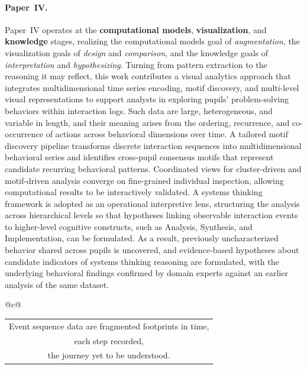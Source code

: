\paragraph{Paper~IV.}
Paper~IV operates at the \textbf{computational models}, \textbf{visualization}, and \textbf{knowledge} stages, realizing the computational models goal of \textit{augmentation}, the visualization goals of \textit{design} and \textit{comparison}, and the knowledge goals of \textit{interpretation} and \textit{hypothesizing}.
Turning from pattern extraction to the reasoning it may reflect, this work contributes a visual analytics approach that integrates multidimensional time series encoding, motif discovery, and multi-level visual representations to support analysts in exploring pupils' problem-solving behaviors within interaction logs.
Such data are large, heterogeneous, and variable in length, and their meaning arises from the ordering, recurrence, and co-occurrence of actions across behavioral dimensions over time.
A tailored motif discovery pipeline transforms discrete interaction sequences into multidimensional behavioral series and identifies cross-pupil consensus motifs that represent candidate recurring behavioral patterns.
Coordinated views for cluster-driven and motif-driven analysis converge on fine-grained individual inspection, allowing computational results to be interactively validated.
A systems thinking framework is adopted as an operational interpretive lens, structuring the analysis across hierarchical levels so that hypotheses linking observable interaction events to higher-level cognitive constructs, such as Analysis, Synthesis, and Implementation, can be formulated.
As a result, previously uncharacterized behavior shared across pupils is uncovered, and evidence-based hypotheses about candidate indicators of systems thinking reasoning are formulated, with the underlying behavioral findings confirmed by domain experts against an earlier analysis of the same dataset.





\label{cha:pub1}

\begin{center}
\begin{tabular}{@{}c@{}}
\\
{\fmmfamily\LARGE
\begin{tabular}{@{}c@{}}
Event sequence data are fragmented footprints in time,\\
each step recorded,\\
the journey yet to be understood.
\end{tabular}}\\
\end{tabular}
\end{center}





